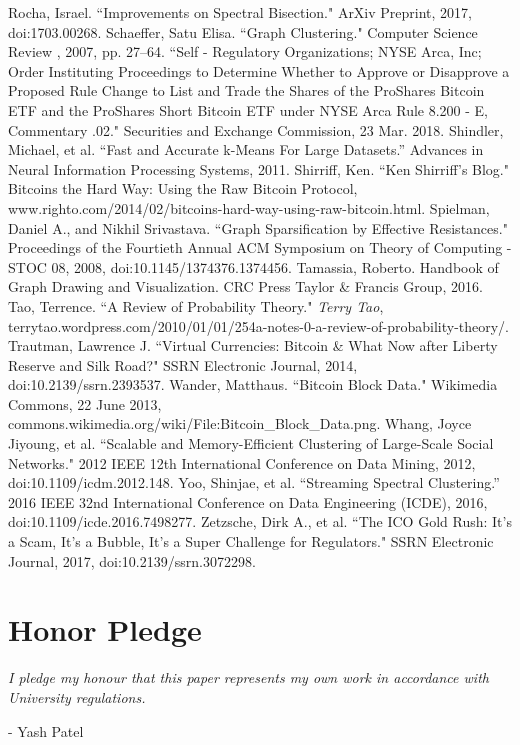 \documentclass{article}
\begin{document}
\begin{thebibliography}{1}
 Rocha, Israel. ``Improvements on Spectral Bisection." ArXiv Preprint, 2017, doi:1703.00268.
 Schaeffer, Satu Elisa. ``Graph Clustering." Computer Science Review , 2007, pp. 27–64.
 ``Self - Regulatory Organizations; NYSE Arca, Inc; Order Instituting Proceedings to Determine Whether to Approve or Disapprove a Proposed Rule Change to List and Trade the Shares of the ProShares Bitcoin ETF and the ProShares Short Bitcoin ETF under NYSE Arca Rule 8.200 - E, Commentary .02." Securities and Exchange Commission, 23 Mar. 2018.
 Shindler, Michael, et al. ``Fast and Accurate k-Means For Large Datasets.” Advances in Neural Information Processing Systems, 2011. 
 Shirriff, Ken. ``Ken Shirriff's Blog." Bitcoins the Hard Way: Using the Raw Bitcoin Protocol, www.righto.com/2014/02/bitcoins-hard-way-using-raw-bitcoin.html. 
 Spielman, Daniel A., and Nikhil Srivastava. ``Graph Sparsification by Effective Resistances." Proceedings of the Fourtieth Annual ACM Symposium on Theory of Computing - STOC 08, 2008, doi:10.1145/1374376.1374456.
 Tamassia, Roberto. Handbook of Graph Drawing and Visualization. CRC Press Taylor \& Francis Group, 2016. 
 Tao, Terrence. ``A Review of Probability Theory." \textit{Terry Tao}, terrytao.wordpress.com/2010/01/01/254a-notes-0-a-review-of-probability-theory/.
 Trautman, Lawrence J. ``Virtual Currencies: Bitcoin \& What Now after Liberty Reserve and Silk Road?" SSRN Electronic Journal, 2014, doi:10.2139/ssrn.2393537.
 Wander, Matthaus. ``Bitcoin Block Data." Wikimedia Commons, 22 June 2013, commons.wikimedia.org/wiki/File:Bitcoin\_Block\_Data.png.
 Whang, Joyce Jiyoung, et al. ``Scalable and Memory-Efficient Clustering of Large-Scale Social Networks." 2012 IEEE 12th International Conference on Data Mining, 2012, doi:10.1109/icdm.2012.148.
 Yoo, Shinjae, et al. “Streaming Spectral Clustering.” 2016 IEEE 32nd International Conference on Data Engineering (ICDE), 2016, doi:10.1109/icde.2016.7498277. 
 Zetzsche, Dirk A., et al. ``The ICO Gold Rush: It's a Scam, It's a Bubble, It's a Super Challenge for Regulators." SSRN Electronic Journal, 2017, doi:10.2139/ssrn.3072298.
\end{thebibliography}

\clearpage
\section*{Honor Pledge}
\textit{I pledge my honour that this paper represents my own work in accordance with University regulations.}

\noindent - Yash Patel
\end{document}
